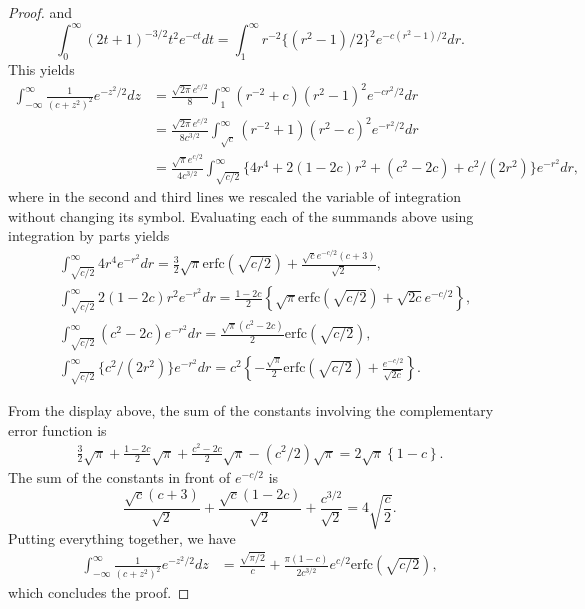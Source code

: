\documentclass[12pt]{article}
\begin{document}
\begin{proof}
and
\begin{equation*}
    \int_0^\infty (2t+1)^{-3/2}t^2 e^{-ct} dt = \int_1^\infty r^{-2} \{(r^2-1)/2\}^2 e^{-c(r^2-1)/2} dr.
\end{equation*}
This yields
\begin{equation*}
    \begin{aligned}
        \int_{-\infty}^\infty \frac{1}{(c + z^2)^{2}}e^{-z^2/2} dz &= \frac{\sqrt{2\pi} e^{c/2}}{8}\int_1^\infty (r^{-2}+c) (r^2-1)^2 e^{-cr^2/2} dr \\
        &= \frac{\sqrt{2\pi} e^{c/2}}{8 c^{3/2}}\int_{\sqrt{c}}^\infty (r^{-2}+1) (r^2-c)^2 e^{-r^2/2} dr \\
        &= \frac{\sqrt{\pi} e^{c/2}}{4 c^{3/2}}\int_{\sqrt{c/2}}^\infty \{4 r^4 + 2(1- 2c)r^2+ (c^2 - 2c) + c^2/(2r^2)\} e^{-r^2} dr ,
    \end{aligned}
\end{equation*}
where in the second and third lines we rescaled the variable of integration without changing its symbol. Evaluating each of the summands above using integration by parts yields
\begin{equation*}
\begin{aligned}
        &\int_{\sqrt{c/2}}^\infty 4 r^4 e^{-r^2} dr = \frac{3}{2}\sqrt{\pi} \mathrm{erfc}(\sqrt{c/2}) + \frac{\sqrt{c}e^{-c/2}(c+3)}{\sqrt{2}},\\
        &\int_{\sqrt{c/2}}^\infty 2(1-2c) r^2 e^{-r^2} dr = \frac{1-2c}{2}\left\{\sqrt{\pi} \mathrm{erfc}(\sqrt{c/2}) + \sqrt{2c} e^{-c/2} \right\},\\
        &\int_{\sqrt{c/2}}^\infty (c^2 - 2c) e^{-r^2} dr = \frac{\sqrt{\pi}(c^2-2c)}{2} \mathrm{erfc}(\sqrt{c/2}),\\
        &\int_{\sqrt{c/2}}^\infty \{c^2/(2r^2)\} e^{-r^2} dr = c^2 \left\{-\frac{\sqrt{\pi}}{2} \mathrm{erfc}(\sqrt{c/2}) + \frac{e^{-c/2}}{\sqrt{2c}}\right\}.
\end{aligned}
\end{equation*}
    
From the display above, the sum of the constants involving the complementary error function is
\begin{equation*}
    \begin{aligned}
        \frac{3}{2}\sqrt{\pi} +\frac{1-2c}{2}\sqrt{\pi} + \frac{c^2-2c}{2}\sqrt{\pi} - (c^2/2)\sqrt{\pi} = 2\sqrt{\pi}\left\{1-c\right\}.
    \end{aligned}
\end{equation*}
The sum of the constants in front of $e^{-c/2}$ is
\begin{equation*}
    \frac{\sqrt{c}(c+3)}{\sqrt{2}} + \frac{\sqrt{c}(1-2c)}{\sqrt{2}} + \frac{c^{3/2}}{\sqrt{2}} = 4\sqrt{\frac{c}{2}}.
\end{equation*}
Putting everything together, we have
\begin{equation*}
\begin{aligned}
    \int_{-\infty}^\infty \frac{1}{(c + z^2)^{2}}e^{-z^2/2} dz &= \frac{\sqrt{\pi/2}}{c} + \frac{\pi(1-c)}{2c^{3/2}}e^{c/2}\mathrm{erfc}(\sqrt{c/2}),
\end{aligned}
\end{equation*}
which concludes the proof.
\end{proof}
\end{document}

